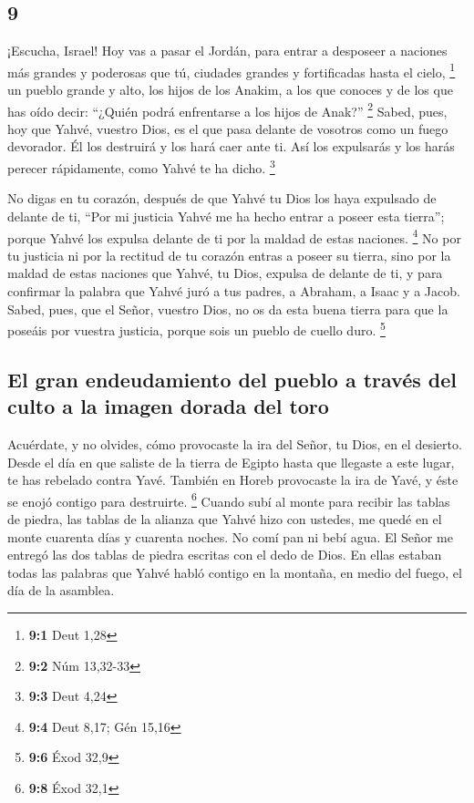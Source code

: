 \begin{paracol}{2}
\hypertarget{section-16}{%
\section{9}\label{section-16}}

 ¡Escucha, Israel! Hoy vas a pasar el Jordán, para entrar
a desposeer a naciones más grandes y poderosas que tú, ciudades grandes
y fortificadas hasta el cielo, \footnote{\textbf{9:1} Deut 1,28}
 un pueblo grande y alto, los hijos de los Anakim, a los
que conoces y de los que has oído decir: ``¿Quién podrá enfrentarse a
los hijos de Anak?'' \footnote{\textbf{9:2} Núm 13,32-33} 
Sabed, pues, hoy que Yahvé, vuestro Dios, es el que pasa delante de
vosotros como un fuego devorador. Él los destruirá y los hará caer ante
ti. Así los expulsarás y los harás perecer rápidamente, como Yahvé te ha
dicho. \footnote{\textbf{9:3} Deut 4,24}

 No digas en tu corazón, después de que Yahvé tu Dios los
haya expulsado de delante de ti, ``Por mi justicia Yahvé me ha hecho
entrar a poseer esta tierra''; porque Yahvé los expulsa delante de ti
por la maldad de estas naciones. \footnote{\textbf{9:4} Deut 8,17; Gén
  15,16}  No por tu justicia ni por la rectitud de tu
corazón entras a poseer su tierra, sino por la maldad de estas naciones
que Yahvé, tu Dios, expulsa de delante de ti, y para confirmar la
palabra que Yahvé juró a tus padres, a Abraham, a Isaac y a Jacob.
 Sabed, pues, que el Señor, vuestro Dios, no os da esta
buena tierra para que la poseáis por vuestra justicia, porque sois un
pueblo de cuello duro. \footnote{\textbf{9:6} Éxod 32,9}

\hypertarget{el-gran-endeudamiento-del-pueblo-a-travuxe9s-del-culto-a-la-imagen-dorada-del-toro}{%
\subsection{El gran endeudamiento del pueblo a través del culto a la
imagen dorada del
toro}\label{el-gran-endeudamiento-del-pueblo-a-travuxe9s-del-culto-a-la-imagen-dorada-del-toro}}

 Acuérdate, y no olvides, cómo provocaste la ira del
Señor, tu Dios, en el desierto. Desde el día en que saliste de la tierra
de Egipto hasta que llegaste a este lugar, te has rebelado contra Yavé.
 También en Horeb provocaste la ira de Yavé, y éste se
enojó contigo para destruirte. \footnote{\textbf{9:8} Éxod 32,1}
 Cuando subí al monte para recibir las tablas de piedra,
las tablas de la alianza que Yahvé hizo con ustedes, me quedé en el
monte cuarenta días y cuarenta noches. No comí pan ni bebí agua.
 El Señor me entregó las dos tablas de piedra escritas
con el dedo de Dios. En ellas estaban todas las palabras que Yahvé habló
contigo en la montaña, en medio del fuego, el día de la asamblea.


\end{paracol}
